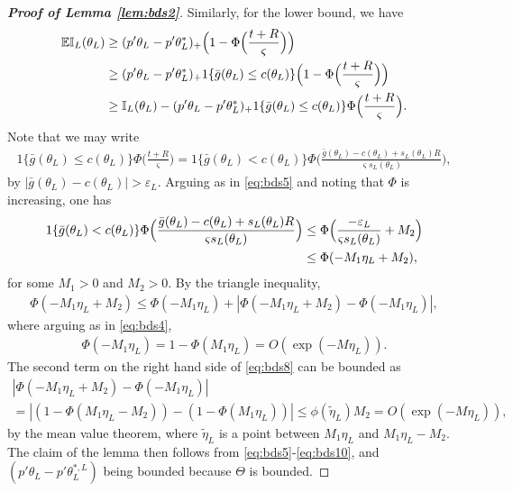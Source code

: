 \documentclass[letterpaper,11pt]{article}
\theoremstyle{myplain}
\theoremstyle{mydefinition}
\theoremstyle{myremark}
\newcommand{\EI}{\mathbb{EI}}
\numberwithin{equation}{section}
\numberwithin{figure}{section}
\begin{document}
\begin{appendix}
\begin{proof}[\rm \textbf{Proof of Lemma \ref{lem:bds2}}]
 Similarly, for the lower bound, we have
 \begin{align}
 	\EI_L(\theta_L)&
 	\ge (p'\theta_L-p'\theta^*_L)_+\Big(1-\Phi\Big(\frac{t+R}{\varsigma}\Big)\Big)\notag\\
 	&\ge (p'\theta_L-p'\theta^*_L)_+1\{\bar g(\theta_L)\le c(\theta_L)\}\Big(1-\Phi\Big(\frac{t+R}{\varsigma}\Big)\Big)\notag\\
 	&\ge \mathbb{I}_L(\theta_L)-(p'\theta_L-p'\theta^*_L)_+1\{\bar g(\theta_L)\le c(\theta_L)\}\Phi\Big(\frac{t+R}{\varsigma}\Big).\label{eq:bds5}
 \end{align}
 Note that we may write
 \begin{align}
 	1\{\bar g(\theta_L)\le c(\theta_L)\}\Phi\Big(\frac{t+R}{\varsigma}\Big)=1\{\bar g(\theta_L)<  c(\theta_L)\}\Phi\Big(\frac{\bar g(\theta_L)- c(\theta_L)+s_L(\theta_L)R}{\varsigma s_L(\theta_L)}\Big),\label{eq:bds6}
 \end{align}
by $|\bar g(\theta_L)-c(\theta_L)|>\varepsilon_L$. Arguing as in \eqref{eq:bds5} and noting that $\Phi$ is increasing, one has
 \begin{align}
 1\{\bar g(\theta_L)<  c(\theta_L)\}\Phi\Big(\frac{\bar g(\theta_L)- c(\theta_L)+s_L(\theta_L)R}{\varsigma s_L(\theta_L)}\Big)&\le \Phi\Big(\frac{-\varepsilon_L}{\varsigma s_L(\theta_L)}+M_2\Big)\notag\\
 &\le \Phi(-M_1\eta_L+M_2),\label{eq:bds7}
 \end{align}
 for some $M_1>0$ and $M_2>0$. By the triangle inequality,
 \begin{align}
 	\Phi(-M_1\eta_L+M_2)\le \Phi(-M_1\eta_L) + |\Phi(-M_1\eta_L+M_2)-\Phi(-M_1\eta_L)|,\label{eq:bds8}
 \end{align}
 where arguing as in \eqref{eq:bds4},
 \begin{align}
 	\Phi(-M_1\eta_L) =1-\Phi(M_1\eta_L)=O(\exp(-M\eta_L)).\label{eq:bds9}
 \end{align}
 The second term on the right hand side of \eqref{eq:bds8}
 can be bounded as
 \begin{multline}
 	|\Phi(-M_1\eta_L+M_2)-\Phi(-M_1\eta_L)|\\
	=|(1-\Phi(M_1\eta_L-M_2))- (1-\Phi(M_1\eta_L))|\le \phi(\tilde\eta_L)M_2=O(\exp(-M\eta_L)),\label{eq:bds10}
 \end{multline}
 by the mean value theorem, where $\tilde\eta_L$ is a point between $M_1\eta_L$ and $M_1\eta_L-M_2$.
  The claim of the lemma then follows from  \eqref{eq:bds5}-\eqref{eq:bds10}, and $(p'\theta_L-p'\theta_L^{*,L})$ being bounded because $\Theta$ is bounded.
\end{proof}



\end{appendix}
\end{document}
